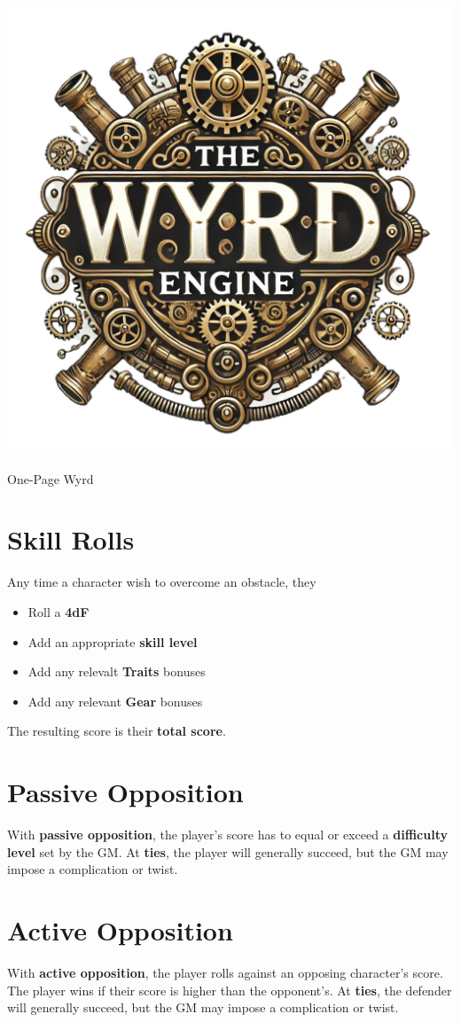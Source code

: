 \documentclass[nodeprecatedcode,bg=print]{dndbook}
\begin{document}
\vspace*{\fill}
\begin{center}
    \includegraphics[width=.1\textwidth]{img/wyrd-logo}
\end{center}
\vspace*{\fill}
\begin{center}
    {\Huge\DndFontPart One-Page Wyrd}\\
    \vspace{1em}
\end{center}
\vspace*{\fill}

\begin{paracol}{2}
    \section*{Skill Rolls}

    Any time a character wish to overcome an obstacle, they
    \begin{itemize}
        \item Roll a \textbf{4dF}
        \item Add an appropriate \textbf{skill level}
        \item Add any relevalt \textbf{Traits} bonuses
        \item Add any relevant \textbf{Gear} bonuses
    \end{itemize}
    The resulting score is their \textbf{total score}.

    \section*{Passive Opposition}
    With \textbf{passive opposition}, the player's score has to equal or exceed a \textbf{difficulty level} set by the GM. At \textbf{ties}, the player will generally succeed, but the GM may impose a complication or twist.

    \section*{Active Opposition}
    With \textbf{active opposition}, the player rolls against an opposing character's score. The player wins if their score is higher than the opponent's. At \textbf{ties}, the defender will generally succeed, but the GM may impose a complication or twist.


\end{paracol}
\end{document}
